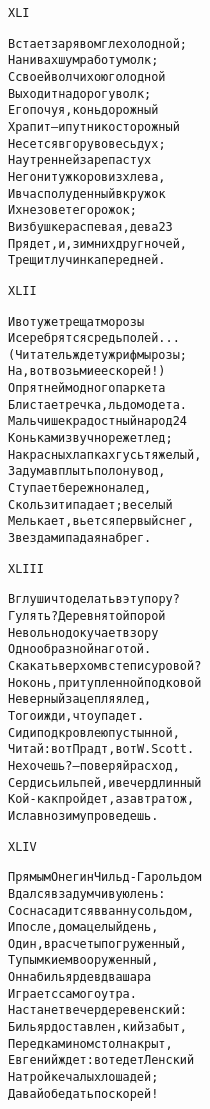\begin{minipage}[t]{\dimexpr 0.5\textwidth -\tabcolsep-.5pt}
\begin{alltt}\normalfont\centering
XLI

Встает заря во мгле холодной;
На нивах шум работ умолк;
С своей волчихою голодной
Выходит на дорогу волк;
Его почуя, конь дорожный
Храпит — и путник осторожный
Несется в гору во весь дух;
На утренней заре пастух
Не гонит уж коров из хлева,
И в час полуденный в кружок
Их не зовет его рожок;
В избушке распевая, дева 23
Прядет, и, зимних друг ночей,
Трещит лучинка перед ней.
\end{alltt}
\end{minipage}

\begin{minipage}[t]{\dimexpr 0.5\textwidth -\tabcolsep-.5pt}
\begin{alltt}\normalfont\centering
XLII

И вот уже трещат морозы
И серебрятся средь полей...
(Читатель ждет уж рифмы розы;
На, вот возьми ее скорей!)
Опрятней модного паркета
Блистает речка, льдом одета.
Мальчишек радостный народ 24
Коньками звучно режет лед;
На красных лапках гусь тяжелый,
Задумав плыть по лону вод,
Ступает бережно на лед,
Скользит и падает; веселый
Мелькает, вьется первый снег,
Звездами падая на брег.
\end{alltt}
\end{minipage}
\clearpage

\begin{minipage}[t]{\dimexpr 0.5\textwidth -\tabcolsep-.5pt}
\begin{alltt}\normalfont\centering
XLIII

В глуши что делать в эту пору?
Гулять? Деревня той порой
Невольно докучает взору
Однообразной наготой.
Скакать верхом в степи суровой?
Но конь, притупленной подковой
Неверный зацепляя лед,
Того и жди, что упадет.
Сиди под кровлею пустынной,
Читай: вот Прадт, вот W. Scott.
Не хочешь? — поверяй расход,
Сердись иль пей, и вечер длинный
Кой-как пройдет, а завтра тож,
И славно зиму проведешь.
\end{alltt}
\end{minipage}

\begin{minipage}[t]{\dimexpr 0.5\textwidth -\tabcolsep-.5pt}
\begin{alltt}\normalfont\centering
XLIV

Прямым Онегин Чильд-Гарольдом
Вдался в задумчивую лень:
Со сна садится в ванну со льдом,
И после, дома целый день,
Один, в расчеты погруженный,
Тупым кием вооруженный,
Он на бильярде в два шара
Играет с самого утра.
Настанет вечер деревенский:
Бильярд оставлен, кий забыт,
Перед камином стол накрыт,
Евгений ждет: вот едет Ленский
На тройке чалых лошадей;
Давай обедать поскорей!
\end{alltt}
\end{minipage}
\clearpage

